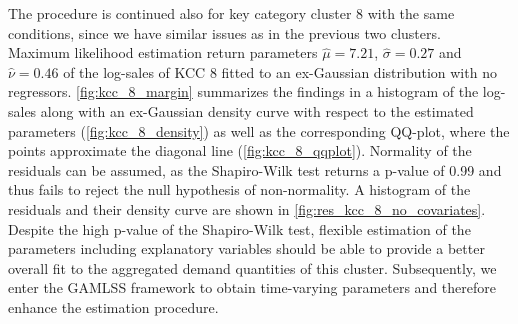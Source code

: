
The procedure is continued also for key category cluster 8 with the same conditions, since we have similar issues as in the previous two clusters.
\\

Maximum likelihood estimation return parameters $\hat{\mu} = 7.21$, $\hat{\sigma} = 0.27$ and $\hat{\nu} = 0.46$ of the log-sales of \ac{KCC} 8 fitted to an ex-Gaussian distribution with no regressors.
\autoref{fig:kcc_8_margin} summarizes the findings in a histogram of the log-sales along with an ex-Gaussian density curve with respect to the estimated parameters (\autoref{fig:kcc_8_density}) as well as the corresponding QQ-plot, where the points approximate the diagonal line (\autoref{fig:kcc_8_qqplot}). Normality of the residuals can be assumed, as the Shapiro-Wilk test returns a p-value of 0.99 and thus fails to reject the null hypothesis of non-normality. A histogram of the residuals and their density curve are shown in \autoref{fig:res_kcc_8_no_covariates}.\\
 Despite the high p-value of the Shapiro-Wilk test, flexible estimation of the parameters including explanatory variables should be able to provide a better overall fit to the aggregated demand quantities of this cluster. Subsequently, we enter the \ac{GAMLSS} framework to obtain time-varying parameters and therefore enhance the estimation procedure.
\\


%



